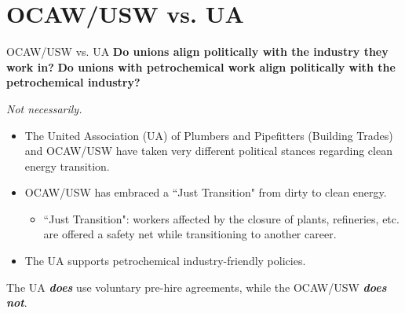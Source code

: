 \documentclass{beamer}
\begin{document}
\section*{OCAW/USW vs. UA}
\begin{frame}{OCAW/USW vs. UA}
\textbf{Do unions align politically with the industry they work in?}\newline
\textbf{Do unions with petrochemical work align politically with the petrochemical industry?}\newline

\emph{Not necessarily.}
	\begin{itemize}
		\item The United Association (UA) of Plumbers and Pipefitters (Building Trades) and OCAW/USW have taken very different political stances regarding clean energy transition.
		\item OCAW/USW has embraced a ``Just Transition" from dirty to clean energy.
	\begin{itemize}
		\item ``Just Transition": workers affected by the closure of plants, refineries, etc. are offered a safety net while transitioning to another career.
	\end{itemize}
	\item The UA supports petrochemical industry-friendly policies.
	\end{itemize}
The UA \textit{\textbf{does}} use voluntary pre-hire agreements, while the OCAW/USW \textbf{\textit{does not}}.
\end{frame}
\end{document}
